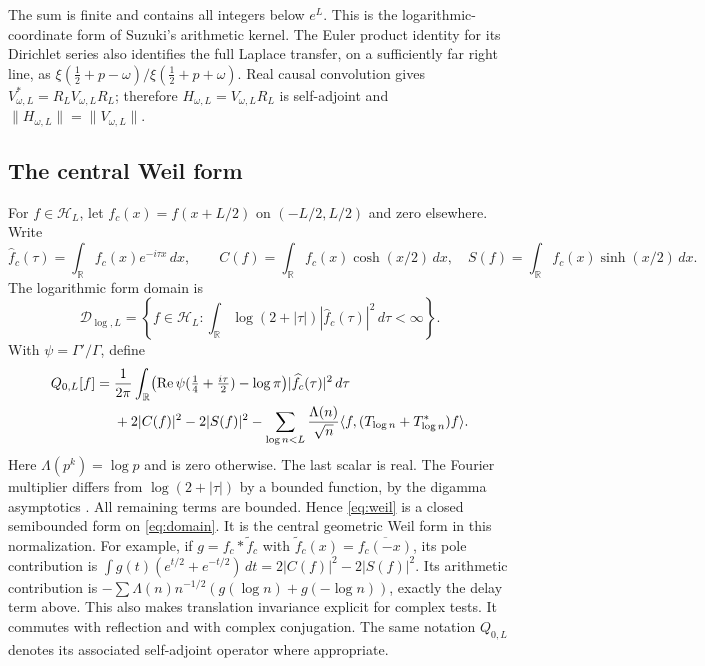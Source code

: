\documentclass[11pt]{article}
\numberwithin{equation}{section}
\theoremstyle{definition}
\theoremstyle{remark}
\newcommand{\HH}{\mathcal H}
\newcommand{\DD}{\mathcal D}
\newcommand{\RR}{\mathbb R}
\newcommand{\Rea}{\operatorname{Re}}
\newcommand{\norm}[1]{\lVert#1\rVert}
\newcommand{\ip}[2]{\langle#1,#2\rangle}
\begin{document}
The sum is finite and contains all integers below $e^L$. This is the
logarithmic-coordinate form of Suzuki's arithmetic kernel. The Euler product
identity for its Dirichlet series also identifies the full Laplace transfer,
on a sufficiently far right line, as
$\xi(\tfrac12+p-\omega)/\xi(\tfrac12+p+\omega)$.
Real causal convolution gives $V_{\omega,L}^*=R_LV_{\omega,L}R_L$;
therefore $H_{\omega,L}=V_{\omega,L}R_L$ is self-adjoint and
$\norm{H_{\omega,L}}=\norm{V_{\omega,L}}$.

\subsection{The central Weil form}

For $f\in\HH_L$, let $f_c(x)=f(x+L/2)$ on $(-L/2,L/2)$ and zero elsewhere.
Write
\[
 \widehat f_c(\tau)=\int_{\RR}f_c(x)e^{-i\tau x}\,dx,\qquad
 C(f)=\int_{\RR}f_c(x)\cosh(x/2)\,dx,\quad
 S(f)=\int_{\RR}f_c(x)\sinh(x/2)\,dx.
\]
The logarithmic form domain is
\begin{equation}\label{eq:domain}
 \DD_{\log,L}=\left\{f\in\HH_L:
 \int_{\RR}\log(2+|\tau|)|\widehat f_c(\tau)|^2\,d\tau<\infty\right\}.
\end{equation}
With $\psi=\Gamma'/\Gamma$, define
\begin{align}
 Q_{0,L}[f]={}&\frac1{2\pi}\int_{\RR}
 \bigl(\Rea\psi(\tfrac14+\tfrac{i\tau}{2})-\log\pi\bigr)
 |\widehat f_c(\tau)|^2\,d\tau\notag\\
 &+2|C(f)|^2-2|S(f)|^2
 -\sum_{\log n<L}\frac{\Lambda(n)}{\sqrt n}
 \ip f{(T_{\log n}+T_{\log n}^*)f}.
 \label{eq:weil}
\end{align}
Here $\Lambda(p^k)=\log p$ and is zero otherwise. The last scalar is real.
The Fourier multiplier differs from $\log(2+|\tau|)$ by a bounded function,
by the digamma asymptotics \cite[\S5.11]{DLMF}. All remaining terms are
bounded. Hence \eqref{eq:weil} is a closed semibounded form on
\eqref{eq:domain}. It is the central geometric Weil form in this normalization.
For example, if $g=f_c*\widetilde f_c$ with
$\widetilde f_c(x)=\overline{f_c(-x)}$, its pole contribution is
$\int g(t)(e^{t/2}+e^{-t/2})\,dt=2|C(f)|^2-2|S(f)|^2$.
Its arithmetic contribution is
$-\sum\Lambda(n)n^{-1/2}(g(\log n)+g(-\log n))$, exactly the delay term
above. This also makes translation invariance explicit for complex tests.
It commutes with reflection and with complex conjugation. The same notation
$Q_{0,L}$ denotes its associated self-adjoint operator where appropriate.
\end{document}

